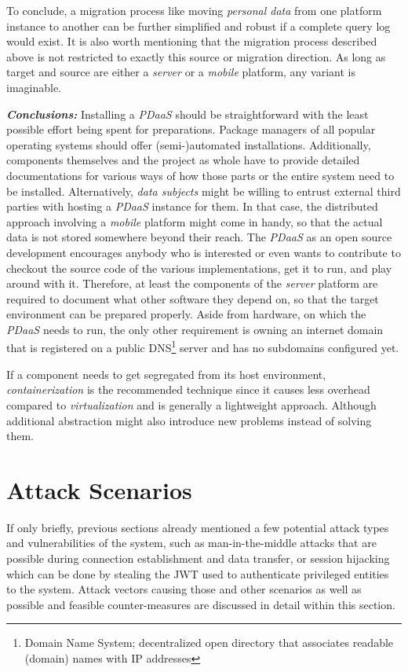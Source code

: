 \documentclass[12pt,english,a4paper,titlepage,cleardoublepage=empty,dottedtoc]{report}
\begin{document}
To conclude, a migration process like moving \emph{personal data} from
one platform instance to another can be further simplified and robust if
a complete query log would exist. It is also worth mentioning that the
migration process described above is not restricted to exactly this
source or migration direction. As long as target and source are either a
\emph{server} or a \emph{mobile} platform, any variant is imaginable.

\emph{\textbf{Conclusions:}} Installing a \emph{PDaaS} should be
straightforward with the least possible effort being spent for
preparations. Package managers of all popular operating systems should
offer (semi-)automated installations. Additionally, components
themselves and the project as whole have to provide detailed
documentations for various ways of how those parts or the entire system
need to be installed. Alternatively, \emph{data subjects} might be
willing to entrust external third parties with hosting a \emph{PDaaS}
instance for them. In that case, the distributed approach involving a
\emph{mobile} platform might come in handy, so that the actual data is
not stored somewhere beyond their reach. The \emph{PDaaS} as an open
source development encourages anybody who is interested or even wants to
contribute to checkout the source code of the various implementations,
get it to run, and play around with it. Therefore, at least the
components of the \emph{server} platform are required to document what
other software they depend on, so that the target environment can be
prepared properly. Aside from hardware, on which the \emph{PDaaS} needs
to run, the only other requirement is owning an internet domain that is
registered on a public DNS\footnote{Domain Name System; decentralized
  open directory that associates readable (domain) names with IP
  addresses} server and has no subdomains configured yet.

If a component needs to get segregated from its host environment,
\emph{containerization} is the recommended technique since it causes
less overhead compared to \emph{virtualization} and is generally a
lightweight approach. Although additional abstraction might also
introduce new problems instead of solving them.

\section{Attack Scenarios}\label{attack-scenarios}

If only briefly, previous sections already mentioned a few potential
attack types and vulnerabilities of the system, such as
man-in-the-middle attacks that are possible during connection
establishment and data transfer, or session hijacking which can be done
by stealing the JWT used to authenticate privileged entities to the
system. Attack vectors causing those and other scenarios as well as
possible and feasible counter-measures are discussed in detail within
this section.
\end{document}
